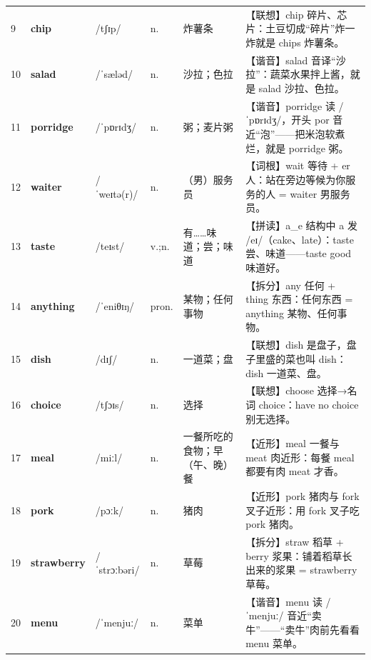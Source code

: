 \documentclass[UTF8,a4paper,11pt,oneside]{ctexbook}
\newcommand{\cellword}[1]{{\bfseries\textcolor{wordcol}{#1}}}
\newcommand{\cellipa}[1]{{\footnotesize\textcolor{ipacol}{#1}}}
\newcommand{\cellpos}[1]{\textcolor{poscol}{#1}}
\newcommand{\cellno}[1]{\textcolor{volcolor!75!black}{#1}}
\begin{document}
{\begin{longtable}{@{}C{0.045\textwidth}L{0.155\textwidth}L{0.175\textwidth}C{0.070\textwidth}L{0.180\textwidth}L{0.282\textwidth}@{}}
 \cellno{9} & \cellword{chip} & \cellipa{/tʃɪp/} & \cellpos{n.} & 炸薯条 & \textcolor{tagAssoc}{【联想】}chip 碎片、芯片：土豆切成“碎片”炸一炸就是 chips 炸薯条。 \\
\cellno{10} & \cellword{salad} & \cellipa{/ˈsæləd/} & \cellpos{n.} & 沙拉；色拉 & \textcolor{tagSound}{【谐音】}salad 音译“沙拉”：蔬菜水果拌上酱，就是 salad 沙拉、色拉。 \\
 \cellno{11} & \cellword{porridge} & \cellipa{/ˈpɒrɪdʒ/} & \cellpos{n.} & 粥；麦片粥 & \textcolor{tagSound}{【谐音】}porridge 读 /ˈpɒrɪdʒ/，开头 por 音近“泡”——把米泡软煮烂，就是 porridge 粥。 \\
\cellno{12} & \cellword{waiter} & \cellipa{/ˈweɪtə(r)/} & \cellpos{n.} & （男）服务员 & \textcolor{tagRoot}{【词根】}wait 等待 + er 人：站在旁边等候为你服务的人 = waiter 男服务员。 \\
 \cellno{13} & \cellword{taste} & \cellipa{/teɪst/} & \cellpos{v.;\allowbreak{}n.} & 有……味道；尝；味道 & \textcolor{tagSpell}{【拼读】}a\_e 结构中 a 发 /eɪ/（cake、late）：taste 尝、味道——taste good 味道好。 \\
\cellno{14} & \cellword{anything} & \cellipa{/ˈeniθɪŋ/} & \cellpos{pron.} & 某物；任何事物 & \textcolor{tagSplit}{【拆分】}any 任何 + thing 东西：任何东西 = anything 某物、任何事物。 \\
 \cellno{15} & \cellword{dish} & \cellipa{/dɪʃ/} & \cellpos{n.} & 一道菜；盘 & \textcolor{tagAssoc}{【联想】}dish 是盘子，盘子里盛的菜也叫 dish：dish 一道菜、盘。 \\
\cellno{16} & \cellword{choice} & \cellipa{/tʃɔɪs/} & \cellpos{n.} & 选择 & \textcolor{tagAssoc}{【联想】}choose 选择→\allowbreak{}名词 choice：have no choice 别无选择。 \\
 \cellno{17} & \cellword{meal} & \cellipa{/miːl/} & \cellpos{n.} & 一餐所吃的食物；早（午、晚）餐 & \textcolor{tagNear}{【近形】}meal 一餐与 meat 肉近形：每餐 meal 都要有肉 meat 才香。 \\
\cellno{18} & \cellword{pork} & \cellipa{/pɔːk/} & \cellpos{n.} & 猪肉 & \textcolor{tagNear}{【近形】}pork 猪肉与 fork 叉子近形：用 fork 叉子吃 pork 猪肉。 \\
 \cellno{19} & \cellword{strawberry} & \cellipa{/ˈstrɔːbəri/} & \cellpos{n.} & 草莓 & \textcolor{tagSplit}{【拆分】}straw 稻草 + berry 浆果：铺着稻草长出来的浆果 = strawberry 草莓。 \\
\cellno{20} & \cellword{menu} & \cellipa{/ˈmenjuː/} & \cellpos{n.} & 菜单 & \textcolor{tagSound}{【谐音】}menu 读 /ˈmenjuː/ 音近“卖牛”——“卖牛”肉前先看看 menu 菜单。 \\

\end{longtable}}
\end{document}
